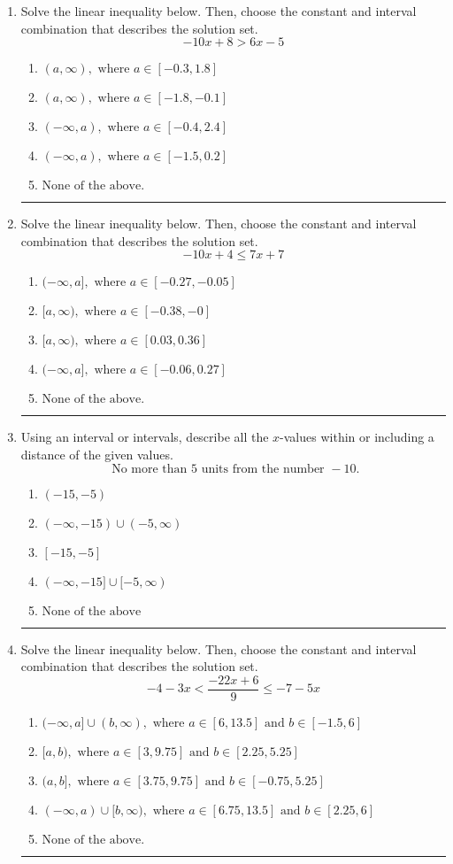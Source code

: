 \documentclass[14pt]{extbook}
\newcommand{\litem}[1]{\item#1\hspace*{-1cm}\rule{\textwidth}{0.4pt}}
\begin{document}
\begin{enumerate}
{\begin{enumerate}[label=\Alph*.]
\end{enumerate} }
\litem{
Solve the linear inequality below. Then, choose the constant and interval combination that describes the solution set.\[ -10x + 8 > 6x -5 \]\begin{enumerate}[label=\Alph*.]
\item \( (a, \infty), \text{ where } a \in [-0.3, 1.8] \)
\item \( (a, \infty), \text{ where } a \in [-1.8, -0.1] \)
\item \( (-\infty, a), \text{ where } a \in [-0.4, 2.4] \)
\item \( (-\infty, a), \text{ where } a \in [-1.5, 0.2] \)
\item \( \text{None of the above}. \)

\end{enumerate} }
\litem{
Solve the linear inequality below. Then, choose the constant and interval combination that describes the solution set.\[ -10x + 4 \leq 7x + 7 \]\begin{enumerate}[label=\Alph*.]
\item \( (-\infty, a], \text{ where } a \in [-0.27, -0.05] \)
\item \( [a, \infty), \text{ where } a \in [-0.38, -0] \)
\item \( [a, \infty), \text{ where } a \in [0.03, 0.36] \)
\item \( (-\infty, a], \text{ where } a \in [-0.06, 0.27] \)
\item \( \text{None of the above}. \)

\end{enumerate} }
\litem{
Using an interval or intervals, describe all the $x$-values within or including a distance of the given values.\[ \text{ No more than } 5 \text{ units from the number } -10. \]\begin{enumerate}[label=\Alph*.]
\item \( (-15, -5) \)
\item \( (-\infty, -15) \cup (-5, \infty) \)
\item \( [-15, -5] \)
\item \( (-\infty, -15] \cup [-5, \infty) \)
\item \( \text{None of the above} \)

\end{enumerate} }
\litem{
Solve the linear inequality below. Then, choose the constant and interval combination that describes the solution set.\[ -4 - 3 x < \frac{-22 x + 6}{9} \leq -7 - 5 x \]\begin{enumerate}[label=\Alph*.]
\item \( (-\infty, a] \cup (b, \infty), \text{ where } a \in [6, 13.5] \text{ and } b \in [-1.5, 6] \)
\item \( [a, b), \text{ where } a \in [3, 9.75] \text{ and } b \in [2.25, 5.25] \)
\item \( (a, b], \text{ where } a \in [3.75, 9.75] \text{ and } b \in [-0.75, 5.25] \)
\item \( (-\infty, a) \cup [b, \infty), \text{ where } a \in [6.75, 13.5] \text{ and } b \in [2.25, 6] \)
\item \( \text{None of the above.} \)


\end{enumerate}}
\end{enumerate}
\end{document}
